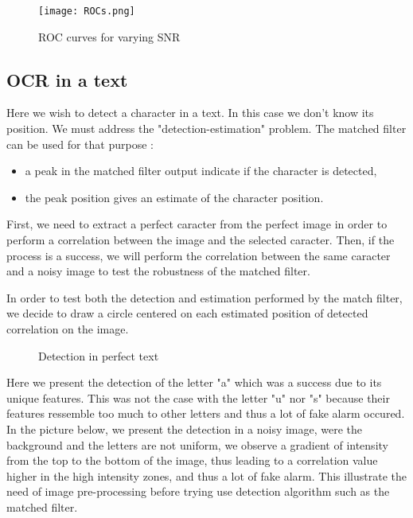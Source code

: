 \begin{figure}[h]
	\centering
	\texttt{[image: ROCs.png]}
	\caption{ROC curves for varying SNR}
	\label{fig:ROCs}
\end{figure}



\subsection{OCR in a text}
Here we wish to detect a character in a text. In this case we don't know its position. We must address the "detection-estimation" problem. The matched filter can be used for that purpose :
\begin{itemize}
    \item a peak in the matched filter output indicate if the character is detected,
    \item the peak position gives an estimate of the character position.
\end{itemize}

First, we need to extract a perfect caracter from the perfect image in order to perform a correlation between the image and the selected caracter. Then, if the process is a success, we will perform the correlation between the same caracter and a noisy image to test the robustness of the matched filter.

In order to test both the detection and estimation performed by the match filter, we decide to draw a circle centered on each estimated position of detected correlation on the image.

\begin{figure}[h]
    \centering
	\caption{Detection in perfect text}
\end{figure}

Here we present the detection of the letter "a" which was a success due to its unique features. This was not the case with the letter "u" nor "s" because their features ressemble too much to other letters and thus a lot of fake alarm occured. In the picture below, we present the detection in a noisy image, were the background and the letters are not uniform, we observe a gradient of intensity from the top to the bottom of the image, thus leading to a correlation value higher in the high intensity zones, and thus a lot of fake alarm. This illustrate the need of image pre-processing before trying use detection algorithm such as the matched filter.

